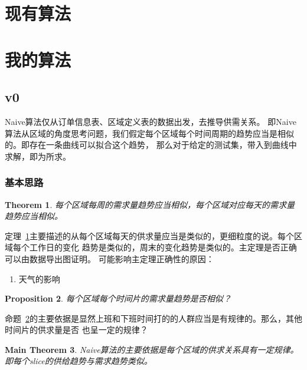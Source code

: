 \documentclass[hyperref,UTF8]{ctexart}
\newtheorem{thm}{Theorem}[subsection]
\newtheorem{prop}[thm]{Proposition}
\newtheorem{mthm}[thm]{Main Theorem}
\theoremstyle{definition}
\theoremstyle{remark}
\numberwithin{equation}{subsection}
\begin{document}
\section{现有算法}
\label{sec:current_algo}



\section{我的算法}
\label{sec:basic_thought}

\subsection{v0}

	Naive算法仅从订单信息表、区域定义表的数据出发，去推导供需关系。
	即Naive算法从区域的角度思考问题，我们假定每个区域每个时间周期的趋势应当是相似的。即存在一条曲线可以拟合这个趋势，
	那么对于给定的测试集，带入到曲线中求解，即为所求。
	
\subsubsection{基本思路}

	\begin{thm}
	\label{thm:v0_district_trend}
	每个区域每周的需求量趋势应当相似，每个区域对应每天的需求量趋势应当相似。
	\end{thm}
	
	定理~\ref{thm:v0_district_trend}主要描述的从每个区域每天的供求量应当是类似的，更细粒度的说。每个区域每个工作日的变化
	趋势是类似的，周末的变化趋势是类似的。主定理是否正确可以由数据导出图证明。
	可能影响主定理正确性的原因：
	\begin{enumerate}[(1)]
	
		\item 天气的影响
		
	\end{enumerate}

	\begin{prop}
	\label{prop:v0_time_slice_trend}
	每个区域每个时间片的需求量趋势是否相似？
	\end{prop}
	
	命题~\ref{prop:v0_time_slice_trend}的主要依据是显然上班和下班时间打的的人群应当是有规律的。那么，其他时间片的供求量是否
	也呈一定的规律？
	
	\begin{mthm}
	\label{mthm:v0_basis}
	Naive算法的主要依据是每个区域的供求关系具有一定规律。即每个slice的供给趋势与需求趋势类似。
	\end{mthm}
	
\end{document}
